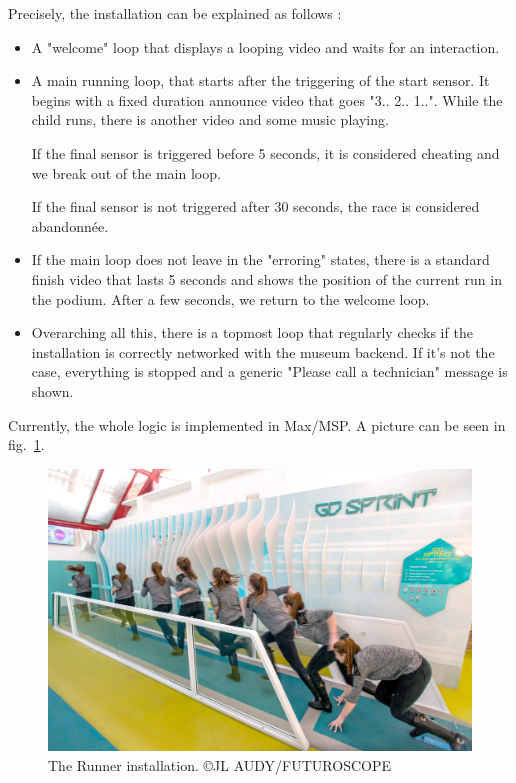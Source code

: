 \documentclass{sigchi}
\begin{document}
Precisely, the installation can be explained as follows : 
\begin{itemize}
    \item A "welcome" loop that displays a looping video and waits for an interaction.
    \item A main running loop, that starts after the triggering of the start sensor. It begins with a fixed duration announce video that goes "3.. 2.. 1..". While the child runs, there is another video and some music playing. 
    
    If the final sensor is triggered before 5 seconds, it is considered cheating and we break out of the main loop.
    
    If the final sensor is not triggered after 30 seconds, the race is considered abandonnée. 
    
    \item If the main loop does not leave in the "erroring" states, there is a standard finish video that lasts 5 seconds and shows the position of the current run in the podium. After a few seconds, we return to the welcome loop.
    
    \item Overarching all this, there is a topmost loop that regularly checks if the installation is correctly networked with the museum backend. If it's not the case, everything is stopped and a generic "Please call a technician" message is shown.
\end{itemize}

Currently, the whole logic is implemented in Max/MSP. A picture can be seen in fig.~\ref{fig.futuroscope}.

\begin{figure}
	\label{fig.futuroscope}
    \centering
    \includegraphics[scale=0.6]{images/futuroscope.jpg}
    \caption{The Runner installation. \tiny{©JL AUDY/FUTUROSCOPE}}
\end{figure}
\end{document}
